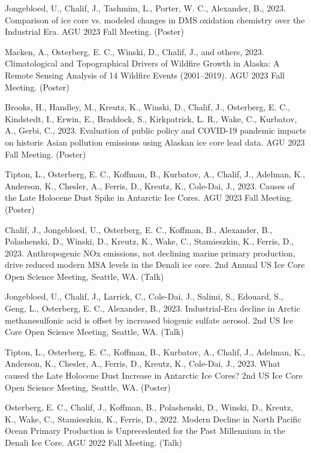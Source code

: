 \documentclass[a4paper,11pt]{article}
\begin{document}
\item[] Jongebloed, U., Chalif, J., Tashmim, L., Porter, W. C., Alexander, B., 2023. Comparison of ice core vs. modeled changes in DMS oxidation chemistry over the Industrial Era. AGU 2023 Fall Meeting. (Poster)

\item[] Macken, A., Osterberg, E. C., Winski, D., Chalif, J., and others, 2023. Climatological and Topographical Drivers of Wildfire Growth in Alaska: A Remote Sensing Analysis of 14 Wildfire Events (2001--2019). AGU 2023 Fall Meeting. (Poster)

\item[] Brooks, H., Handley, M., Kreutz, K., Winski, D., Chalif, J., Osterberg, E. C., Kindstedt, I., Erwin, E., Braddock, S., Kirkpatrick, L. R., Wake, C., Kurbatov, A., Gerbi, C., 2023. Evaluation of public policy and COVID-19 pandemic impacts on historic Asian pollution emissions using Alaskan ice core lead data. AGU 2023 Fall Meeting. (Poster)

\item[] Tipton, L., Osterberg, E. C., Koffman, B., Kurbatov, A., Chalif, J., Adelman, K., Anderson, K., Chesler, A., Ferris, D., Kreutz, K., Cole-Dai, J., 2023. Causes of the Late Holocene Dust Spike in Antarctic Ice Cores. AGU 2023 Fall Meeting. (Poster)

\item[] Chalif, J., Jongebloed, U., Osterberg, E. C., Koffman, B., Alexander, B., Polashenski, D., Winski, D., Kreutz, K., Wake, C., Stamieszkin, K., Ferris, D., 2023. Anthropogenic NOx emissions, not declining marine primary production, drive reduced modern MSA levels in the Denali ice core. 2nd Annual US Ice Core Open Science Meeting, Seattle, WA. (Talk)

\item[] Jongebloed, U., Chalif, J., Larrick, C., Cole-Dai, J., Salimi, S., Edouard, S., Geng, L., Osterberg, E. C., Alexander, B., 2023. Industrial-Era decline in Arctic methanesulfonic acid is offset by increased biogenic sulfate aerosol. 2nd US Ice Core Open Science Meeting, Seattle, WA. (Talk)

\item[] Tipton, L., Osterberg, E. C., Koffman, B., Kurbatov, A., Chalif, J., Adelman, K., Anderson, K., Chesler, A., Ferris, D., Kreutz, K., Cole-Dai, J., 2023. What caused the Late Holocene Dust Increase in Antarctic Ice Cores? 2nd US Ice Core Open Science Meeting, Seattle, WA. (Poster)

\item[\textbf{2022}] Osterberg, E. C., Chalif, J., Koffman, B., Polashenski, D., Winski, D., Kreutz, K., Wake, C., Stamieszkin, K., Ferris, D., 2022. Modern Decline in North Pacific Ocean Primary Production is Unprecedented for the Past Millennium in the Denali Ice Core. AGU 2022 Fall Meeting. (Talk)
\end{document}
